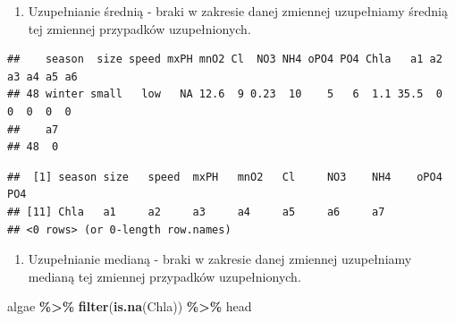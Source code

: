 \documentclass[
]{book}
\newenvironment{Shaded}{\begin{snugshade}}{\end{snugshade}}
\newcommand{\AttributeTok}[1]{\textcolor[rgb]{0.13,0.29,0.53}{#1}}
\newcommand{\FunctionTok}[1]{\textcolor[rgb]{0.13,0.29,0.53}{\textbf{#1}}}
\newcommand{\NormalTok}[1]{#1}
\newcommand{\OtherTok}[1]{\textcolor[rgb]{0.56,0.35,0.01}{#1}}
\newcommand{\SpecialCharTok}[1]{\textcolor[rgb]{0.81,0.36,0.00}{\textbf{#1}}}
\newcommand{\StringTok}[1]{\textcolor[rgb]{0.31,0.60,0.02}{#1}}
\providecommand{\tightlist}{%
  \setlength{\itemsep}{0pt}\setlength{\parskip}{0pt}}
\theoremstyle{plain}
\theoremstyle{definition}
\theoremstyle{definition}
\theoremstyle{definition}
\theoremstyle{definition}
\theoremstyle{definition}
\theoremstyle{remark}
\begin{document}
\begin{enumerate}
\def\labelenumi{\arabic{enumi}.}
\tightlist
\item
  Uzupełnianie średnią - braki w zakresie danej zmiennej uzupełniamy średnią tej zmiennej przypadków uzupełnionych.
\end{enumerate}

\begin{Shaded}
\end{Shaded}

\begin{verbatim}
##    season  size speed mxPH mnO2 Cl  NO3 NH4 oPO4 PO4 Chla   a1 a2 a3 a4 a5 a6
## 48 winter small   low   NA 12.6  9 0.23  10    5   6  1.1 35.5  0  0  0  0  0
##    a7
## 48  0
\end{verbatim}

\begin{Shaded}
\end{Shaded}

\begin{verbatim}
##  [1] season size   speed  mxPH   mnO2   Cl     NO3    NH4    oPO4   PO4   
## [11] Chla   a1     a2     a3     a4     a5     a6     a7    
## <0 rows> (or 0-length row.names)
\end{verbatim}

\begin{enumerate}
\def\labelenumi{\arabic{enumi}.}
\setcounter{enumi}{1}
\tightlist
\item
  Uzupełnianie medianą - braki w zakresie danej zmiennej uzupełniamy medianą tej zmiennej przypadków uzupełnionych.
\end{enumerate}

\begin{Shaded}
\begin{Highlighting}[]
\NormalTok{algae }\SpecialCharTok{\%\textgreater{}\%} \FunctionTok{filter}\NormalTok{(}\FunctionTok{is.na}\NormalTok{(Chla)) }\SpecialCharTok{\%\textgreater{}\%}\NormalTok{ head}
\end{Highlighting}
\end{Shaded}
\end{document}

